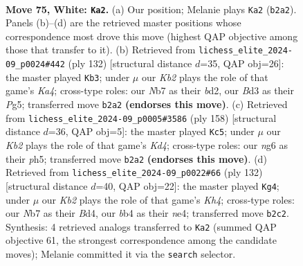 \documentclass[11pt]{article}
\begin{document}
\clearpage

\begin{figure}[p]\centering
\begin{subfigure}{0.46\textwidth}\centering
\resizebox{\linewidth}{!}{%
\newchessgame
\chessboard[
  setfen={8/1Nn5/6nk/p7/Pb1pP3/1P1B3p/1K2P3/8 w - - 16 75},
  showmover=false,
  pgfstyle=straightmove, color=movearrow, markmove={b2-a2}
]}
\caption{}
\end{subfigure}\hfill
\begin{subfigure}{0.46\textwidth}\centering
\resizebox{\linewidth}{!}{%
\newchessgame
\chessboard[
  setfen={2k5/1p6/6p1/1P1pBpP1/K2P1P2/8/3b4/8 w - - 35 67},
  showmover=false,
  pgfstyle=straightmove, color=movearrow, markmove={a4-b3}
]}
\caption{}
\end{subfigure}
\\[4pt]
\begin{subfigure}{0.46\textwidth}\centering
\resizebox{\linewidth}{!}{%
\newchessgame
\chessboard[
  setfen={8/8/p3pBk1/P3P2p/1P1K3P/8/8/5b2 w - - 40 80},
  showmover=false,
  pgfstyle=straightmove, color=movearrow, markmove={d4-c5}
]}
\caption{}
\end{subfigure}\hfill
\begin{subfigure}{0.46\textwidth}\centering
\resizebox{\linewidth}{!}{%
\newchessgame
\chessboard[
  setfen={6k1/8/4pp2/3p3P/3BnP1K/4P2P/8/8 w - - 19 67},
  showmover=false,
  pgfstyle=straightmove, color=movearrow, markmove={h4-g4}
]}
\caption{}
\end{subfigure}
\caption{\textbf{Move 75, White: \texttt{Ka2}.} (a) Our position; Melanie plays \texttt{Ka2} (\texttt{b2a2}). Panels (b)--(d) are the retrieved master positions whose correspondence most drove this move (highest QAP objective among those that transfer to it). (b) Retrieved from \texttt{lichess\_elite\_2024-09\_p0024\#442} (ply 132) [structural distance $d$=35, QAP obj=26]: the master played \texttt{Kb3}; under $\mu$ our \emph{Kb2} plays the role of that game's \emph{Ka4}; cross-type roles: our \emph{N}b7 as their \emph{b}d2, our \emph{B}d3 as their \emph{P}g5; transferred move \texttt{b2a2} \textbf{(endorses this move)}. (c) Retrieved from \texttt{lichess\_elite\_2024-09\_p0005\#3586} (ply 158) [structural distance $d$=36, QAP obj=5]: the master played \texttt{Kc5}; under $\mu$ our \emph{Kb2} plays the role of that game's \emph{Kd4}; cross-type roles: our \emph{n}g6 as their \emph{p}h5; transferred move \texttt{b2a2} \textbf{(endorses this move)}. (d) Retrieved from \texttt{lichess\_elite\_2024-09\_p0022\#66} (ply 132) [structural distance $d$=40, QAP obj=22]: the master played \texttt{Kg4}; under $\mu$ our \emph{Kb2} plays the role of that game's \emph{Kh4}; cross-type roles: our \emph{N}b7 as their \emph{B}d4, our \emph{b}b4 as their \emph{n}e4; transferred move \texttt{b2c2}. Synthesis: 4 retrieved analogs transferred to \texttt{Ka2} (summed QAP objective 61, the strongest correspondence among the candidate moves); Melanie committed it via the \texttt{search} selector.}
\label{fig:thought-m148}
\end{figure}
\end{document}
